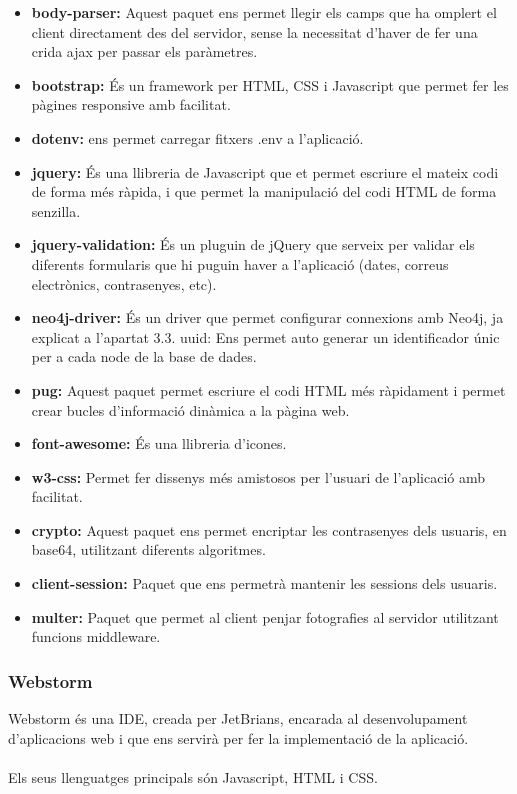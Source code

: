 \documentclass[11pt,catalan,listoffigures,listoftables]{tfgetsinf}
\begin{document}
\begin{itemize}
\item \textbf{body-parser:} Aquest paquet ens permet llegir els camps que ha omplert el client directament des del servidor, sense la necessitat d'haver de fer una crida ajax per passar els paràmetres.
\item \textbf{bootstrap:} És un framework per HTML, CSS i Javascript que permet fer les pàgines responsive amb facilitat.
\item \textbf{dotenv:} ens permet carregar fitxers .env a l'aplicació.
\item \textbf{jquery:} És una llibreria de Javascript que et permet escriure el mateix codi de forma més ràpida, i que permet la manipulació del codi HTML de forma senzilla.
\item \textbf{jquery-validation:} És un pluguin de jQuery que serveix per validar els diferents formularis que hi puguin haver a l'aplicació (dates, correus electrònics, contrasenyes, etc).
\item \textbf{neo4j-driver:} És un driver que permet configurar connexions amb Neo4j, ja explicat a l'apartat 3.3.
uuid: Ens permet auto generar un identificador únic per a cada node de la base de dades.
\item \textbf{pug:} Aquest paquet permet escriure el codi HTML més ràpidament i permet crear bucles d'informació dinàmica a la pàgina web.
\item \textbf{font-awesome:} És una llibreria d'icones.
\item \textbf{w3-css:} Permet fer dissenys més amistosos per l'usuari de l'aplicació amb facilitat.
\item \textbf{crypto:} Aquest paquet ens permet encriptar les contrasenyes dels usuaris, en base64, utilitzant diferents algoritmes.
\item \textbf{client-session:} Paquet que ens permetrà mantenir les sessions dels usuaris.
\item \textbf{multer:} Paquet que permet al client penjar fotografies al servidor utilitzant funcions middleware.

\end{itemize}

\subsubsection{Webstorm}

Webstorm és una IDE, creada per JetBrians, encarada al desenvolupament d'aplicacions web i que ens servirà per fer la implementació de la aplicació.\\ \\
Els seus llenguatges principals són Javascript, HTML i CSS.
\end{document}
